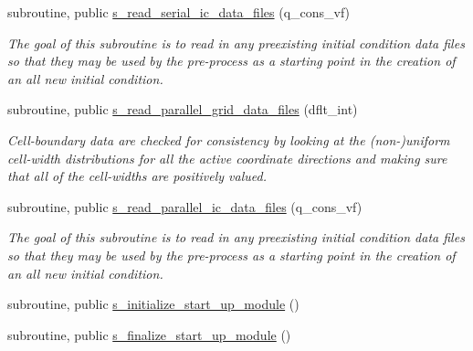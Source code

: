 \begin{DoxyCompactItemize}
subroutine, public \hyperlink{namespacem__start__up_a88f1f355d8aeecb6cd47653ed285cfa2}{s\+\_\+read\+\_\+serial\+\_\+ic\+\_\+data\+\_\+files} (q\+\_\+cons\+\_\+vf)
\begin{DoxyCompactList}\small\item\em The goal of this subroutine is to read in any preexisting initial condition data files so that they may be used by the pre-\/process as a starting point in the creation of an all new initial condition. \end{DoxyCompactList}\item 
subroutine, public \hyperlink{namespacem__start__up_aaaad3d18eef01d1d8387e34a8b7d33ac}{s\+\_\+read\+\_\+parallel\+\_\+grid\+\_\+data\+\_\+files} (dflt\+\_\+int)
\begin{DoxyCompactList}\small\item\em Cell-\/boundary data are checked for consistency by looking at the (non-\/)uniform cell-\/width distributions for all the active coordinate directions and making sure that all of the cell-\/widths are positively valued. \end{DoxyCompactList}\item 
subroutine, public \hyperlink{namespacem__start__up_a25daee88d75c57908efa6e3e0516fb28}{s\+\_\+read\+\_\+parallel\+\_\+ic\+\_\+data\+\_\+files} (q\+\_\+cons\+\_\+vf)
\begin{DoxyCompactList}\small\item\em The goal of this subroutine is to read in any preexisting initial condition data files so that they may be used by the pre-\/process as a starting point in the creation of an all new initial condition. \end{DoxyCompactList}\item 
subroutine, public \hyperlink{namespacem__start__up_a37202711d89d04cd18f08170ba608aa1}{s\+\_\+initialize\+\_\+start\+\_\+up\+\_\+module} ()
\item 
subroutine, public \hyperlink{namespacem__start__up_a65fd279db64882a3732a0549ec74e335}{s\+\_\+finalize\+\_\+start\+\_\+up\+\_\+module} ()
\end{DoxyCompactItemize}

